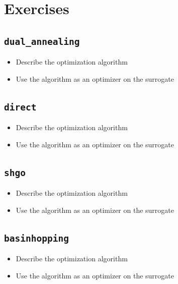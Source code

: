 \documentclass[
  letterpaper,
  DIV=11,
  numbers=noendperiod]{scrreprt}
\providecommand{\tightlist}{%
  \setlength{\itemsep}{0pt}\setlength{\parskip}{0pt}}\usepackage{longtable,booktabs,array}
\begin{document}
\hypertarget{exercises}{%
\section{Exercises}\label{exercises}}

\hypertarget{dual_annealing}{%
\subsection{\texorpdfstring{\texttt{dual\_annealing}}{dual\_annealing}}\label{dual_annealing}}

\begin{itemize}
\tightlist
\item
  Describe the optimization algorithm
\item
  Use the algorithm as an optimizer on the surrogate
\end{itemize}

\hypertarget{direct-1}{%
\subsection{\texorpdfstring{\texttt{direct}}{direct}}\label{direct-1}}

\begin{itemize}
\tightlist
\item
  Describe the optimization algorithm
\item
  Use the algorithm as an optimizer on the surrogate
\end{itemize}

\hypertarget{shgo-1}{%
\subsection{\texorpdfstring{\texttt{shgo}}{shgo}}\label{shgo-1}}

\begin{itemize}
\tightlist
\item
  Describe the optimization algorithm
\item
  Use the algorithm as an optimizer on the surrogate
\end{itemize}

\hypertarget{basinhopping}{%
\subsection{\texorpdfstring{\texttt{basinhopping}}{basinhopping}}\label{basinhopping}}

\begin{itemize}
\tightlist
\item
  Describe the optimization algorithm
\item
  Use the algorithm as an optimizer on the surrogate
\end{itemize}
\end{document}

